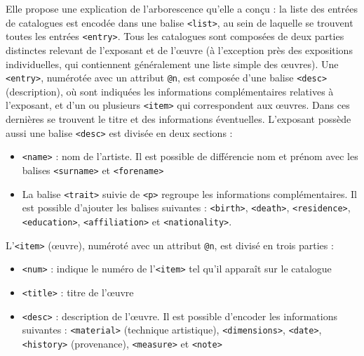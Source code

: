 \documentclass[a4paper,12pt,twoside]{book}
\begin{document}
Elle propose une explication de l'arborescence qu'elle a conçu : la liste des entrées de catalogues est  encodée dans une balise \texttt{<list>}, au sein de laquelle se trouvent toutes les entrées \texttt{<entry>}. Tous les catalogues sont composées de deux parties distinctes relevant de l’exposant et de l’œuvre (à l'exception près des expositions individuelles, qui contiennent généralement une liste simple des œuvres). Une \texttt{<entry>}, numérotée avec un attribut \texttt{@n}, est composée d’une balise \texttt{<desc>} (description), où sont indiquées les informations complémentaires relatives à l’exposant, et d’un ou plusieurs \texttt{<item>} qui correspondent aux œuvres. Dans ces dernières se trouvent le titre et des informations éventuelles. L'exposant possède aussi une balise \texttt{<desc>} est divisée en deux sections :
\begin{itemize}
	\item \texttt{<name>} : nom de l’artiste. Il est possible de différencie nom et prénom avec les balises  \texttt{<surname>} et \texttt{<forename>}
	\item La balise \texttt{<trait>} suivie de \texttt{<p>} regroupe  les informations complémentaires. Il est possible d’ajouter les balises suivantes : \texttt{<birth>}, \texttt{<death>}, \texttt{<residence>}, \texttt{<education>}, \texttt{<affiliation>} et \texttt{<nationality>}.
\end{itemize}

L’\texttt{<item>} (œuvre), numéroté avec un attribut \texttt{@n}, est divisé en trois parties :
\begin{itemize}
	\item \texttt{<num>} : indique le numéro de l’\texttt{<item>} tel qu'il apparaît sur le catalogue
	\item \texttt{<title>} : titre de l’œuvre
	\item \texttt{<desc>} : description de l’œuvre. Il est possible d’encoder les informations suivantes : \texttt{<material>} (technique artistique), \texttt{<dimensions>}, \texttt{<date>}, \texttt{<history>} (provenance), \texttt{<measure>} et \texttt{<note>}
\end{itemize}
\end{document}
